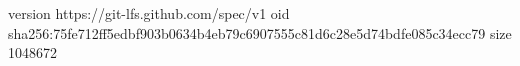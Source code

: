 version https://git-lfs.github.com/spec/v1
oid sha256:75fe712ff5edbf903b0634b4eb79c6907555c81d6c28e5d74bdfe085c34ecc79
size 1048672
